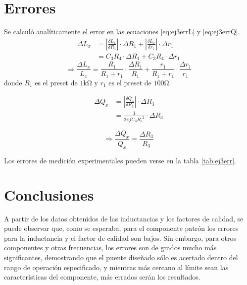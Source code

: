     \section{Errores}
    Se calculó analíticamente el error en las ecuaciones \ref{eq:ej3errL} y \ref{eq:ej3errQ}.
    \begin{equation*}
        \begin{split}
            \Delta L_x &=\left| \frac{\delta L_x}{\delta R_1} \right| \cdot \Delta R_1 + \left| \frac{\delta L_x}{\delta r_1} \right| \cdot \Delta r_1\\
                       &= C_3 R_4 \cdot \Delta R_1 + C_3 R_4 \cdot \Delta r_1
        \end{split}
    \end{equation*}
    \begin{equation}
        \Rightarrow\frac{\Delta L_x}{L_x} = \frac{R_1}{R_1+r_1}\cdot\frac{\Delta R_1}{R_1} + \frac{r_1}{R_1+r_1}\cdot\frac{\Delta r_1}{r_1}
        \label{eq:ej3errL}
    \end{equation}
    donde $R_1$ es el preset de $1\si{\kilo\ohm}$ y $r_1$ es el preset de $100\si{\ohm}$.

    \begin{equation*}
        \begin{split}
            \Delta Q_x &= \left| \frac{\delta Q_x}{\delta R_3} \right| \cdot \Delta R_3\\
                       &= \frac{1}{ 2 \pi f C_3 {R_3}^2} \cdot \Delta R_3
        \end{split}
    \end{equation*}

    \begin{equation}
        \Rightarrow\frac{\Delta Q_x}{Q_x} = \frac{\Delta R_3}{R_3}
        \label{eq:ej3errQ}
    \end{equation}

    
    

    Los errores de medición experimentales pueden verse en la tabla \ref{tab:ej3err}.

    \newpage
    \section{Conclusiones}

    A partir de los datos obtenidos de las inductancias y los factores de calidad, se puede
    observar que, como se esperaba, para el componente patrón los errores para la inductancia
    y el factor de calidad son bajos. Sin embargo, para otros componentes y otras frecuencias,
    los errores son de grados mucho más significantes, demostrando que el puente diseñado
    sólo es acertado dentro del rango de operación especificado, y mientras más cercano al
    límite sean las características del componente, más errados serán los resultados.


